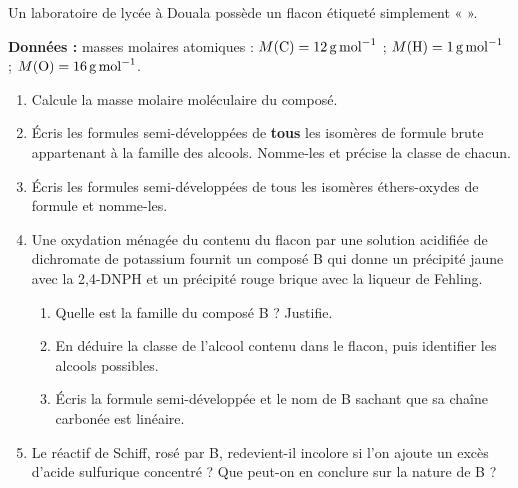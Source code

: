 \documentclass[11pt]{article}
\begin{document}
\begin{exercice}
Un laboratoire de lycée à Douala possède un flacon étiqueté simplement «  ».

\textbf{Données :} masses molaires atomiques : $M(\ce{C}) = \SI{12}{g.mol^{-1}}$ ; $M(\ce{H}) = \SI{1}{g.mol^{-1}}$ ; $M(\ce{O}) = \SI{16}{g.mol^{-1}}$.
\begin{enumerate}
\item Calcule la masse molaire moléculaire du composé.
\item Écris les formules semi-développées de \textbf{tous} les isomères de formule brute  appartenant à la famille des alcools. Nomme-les et précise la classe de chacun.
\item Écris les formules semi-développées de tous les isomères éthers-oxydes de formule  et nomme-les.
\item Une oxydation ménagée du contenu du flacon par une solution acidifiée de dichromate de potassium fournit un composé B qui donne un précipité jaune avec la 2,4-DNPH et un précipité rouge brique avec la liqueur de Fehling.
\begin{enumerate}
\item Quelle est la famille du composé B ? Justifie.
\item En déduire la classe de l'alcool contenu dans le flacon, puis identifier les alcools possibles.
\item Écris la formule semi-développée et le nom de B sachant que sa chaîne carbonée est linéaire.
\end{enumerate}
\item Le réactif de Schiff, rosé par B, redevient-il incolore si l'on ajoute un excès d'acide sulfurique concentré ? Que peut-on en conclure sur la nature de B ?
\end{enumerate}
\end{exercice}
\end{document}

